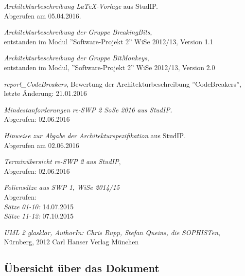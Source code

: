 \documentclass[fontsize=12pt,paper=a4,twoside]{scrartcl}
\begin{document}
\begin{compactenum}
\item \textit{Architekturbeschreibung \LaTeX-Vorlage} aus StudIP. \\ Abgerufen am 05.04.2016.
\item \textit{Architekturbeschreibung der Gruppe BreakingBits}, \\ entstanden im Modul ''Software-Projekt 2'' WiSe 2012/13, Version 1.1
\item \textit{Architekturbeschreibung der Gruppe BitMonkeys}, \\ entstanden im Modul, 
''Software-Projekt 2'' WiSe 2012/13, Version 2.0
\item \textit{report\_CodeBreakers}, Bewertung der Architekturbeschreibung ''CodeBreakers'',\\ letzte Änderung: 21.01.2016
\item \textit{Mindestanforderungen re-SWP 2 SoSe 2016 aus StudIP.} \\ Abgerufen: 02.06.2016
\item \textit{Hinweise zur Abgabe der Architekturspezifikation} aus StudIP. \\ Abgerufen am 02.06.2016
\item \textit{Terminübersicht re-SWP 2 aus StudIP}, \\ Abgerufen: 02.06.2016
\item \textit{Foliensätze aus SWP 1, WiSe 2014/15} \\ Abgerufen: \\ \textit{Sätze 01-10:} 14.07.2015 \\ \textit{Sätze 11-12:} 07.10.2015
\item \textit{UML 2 glasklar, AuthorIn: Chris Rupp, Stefan Queins, die SOPHISTen}, \\
Nürnberg, 2012 Carl Hanser Verlag München
\end{compactenum}
	
\subsection{Übersicht über das Dokument}
\end{document}
